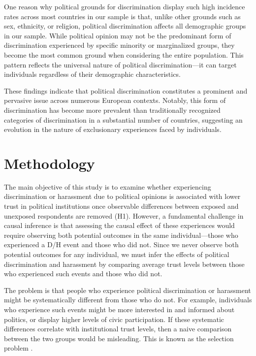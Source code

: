 \documentclass{article}
\begin{document}
One reason why political grounds for discrimination display such high incidence rates across most countries in our sample is that, unlike other grounds such as sex, ethnicity, or religion, political discrimination affects all demographic groups in our sample. While political opinion may not be the predominant form of discrimination experienced by specific minority or marginalized groups, they become the most common ground when considering the entire population. This pattern reflects the universal nature of political discrimination—it can target individuals regardless of their demographic characteristics.

These findings indicate that political discrimination constitutes a prominent and pervasive issue across numerous European contexts. Notably, this form of discrimination has become more prevalent than traditionally recognized categories of discrimination in a substantial number of countries, suggesting an evolution in the nature of exclusionary experiences faced by individuals.



\section{Methodology}

The main objective of this study is to examine whether experiencing discrimination or harassment due to political opinions is associated with lower trust in political institutions once observable differences between exposed and unexposed respondents are removed (H1). However, a fundamental challenge in causal inference is that assessing the causal effect of these experiences would require observing both potential outcomes in the same individual—those who experienced a D/H event and those who did not. Since we never observe both potential outcomes for any individual, we must infer the effects of political discrimination and harassment by comparing average trust levels between those who experienced such events and those who did not.

The problem is that people who experience political discrimination or harassment might be systematically different from those who do not. For example, individuals who experience such events might be more interested in and informed about politics, or display higher levels of civic participation. If these systematic differences correlate with institutional trust levels, then a naive comparison between the two groups would be misleading. This is known as the selection problem \parencite{angrist_mostly_2009}.
\end{document}
